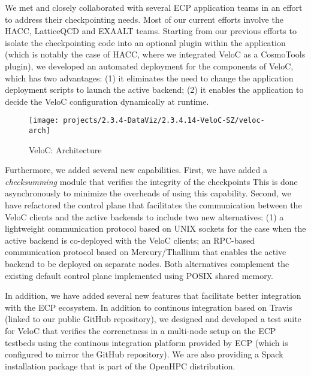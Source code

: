 We met and closely collaborated with several ECP application teams in
an effort to address their checkpointing needs. Most of our current
efforts involve the HACC, LatticeQCD and EXAALT teams. Starting from
our previous efforts to isolate the checkpointing code into an optional
plugin within the application (which is notably the case of HACC, where
we integrated VeloC as a CosmoTools plugin), we developed an automated
deployment for the components of VeloC, which has two advantages: (1)
it eliminates the need to change the application deployment scripts
to launch the active backend; (2) it enables the application to decide
the VeloC configuration dynamically at runtime.

\begin{wrapfigure}{l}{0.47\textwidth}
  \texttt{[image: projects/2.3.4-DataViz/2.3.4.14-VeloC-SZ/veloc-arch]}
  \caption{VeloC: Architecture}%
  \label{fig:veloc:arch}%
\end{wrapfigure}

Furthermore, we added several new capabilities. First, we have added
a \emph{checksumming} module that verifies the integrity of the checkpoints
This is done asynchronously to minimize the overheads of using this capability.
Second, we have refactored the control plane that facilitates the communication
between the VeloC clients and the active backends to include two new alternatives:
(1) a lightweight communication protocol based on UNIX sockets for the case
when the active backend is co-deployed with the VeloC clients; an RPC-based
communication protocol based on Mercury/Thallium that enables the active
backend to be deployed on separate nodes. Both alternatives complement the
existing default control plane implemented using POSIX shared memory.

In addition, we have added several new features that facilitate better
integration with the ECP ecosystem. In addition to continous
integration based on Travis (linked to our public GitHub repository),
we designed and developed a test suite for VeloC that verifies the
correnctness in a multi-node setup on the ECP testbeds using the
continous integration platform provided by ECP (which is configured to
mirror the GitHub repository). We are also providing a Spack
installation package that is part of the OpenHPC distribution.

